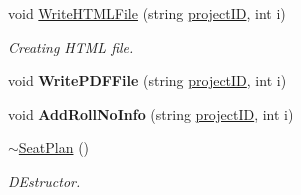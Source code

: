 \begin{DoxyCompactItemize}
\item 
void \hyperlink{classSeatPlan_a67c10e2277f1f2823581cddf4df373c5}{Write\-H\-T\-M\-L\-File} (string \hyperlink{classReadInput_a3ad470a25b3e0a29466bf4ff1f7d8e81}{project\-I\-D}, int i)
\begin{DoxyCompactList}\small\item\em Creating H\-T\-M\-L file. \end{DoxyCompactList}\item 
\hypertarget{classSeatPlan_abce0c5b5545f1bb1ebcf2e578b6ab282}{void {\bfseries Write\-P\-D\-F\-File} (string \hyperlink{classReadInput_a3ad470a25b3e0a29466bf4ff1f7d8e81}{project\-I\-D}, int i)}\label{classSeatPlan_abce0c5b5545f1bb1ebcf2e578b6ab282}

\item 
\hypertarget{classSeatPlan_a3257eb25ac9c82d2757d2a7144614762}{void {\bfseries Add\-Roll\-No\-Info} (string \hyperlink{classReadInput_a3ad470a25b3e0a29466bf4ff1f7d8e81}{project\-I\-D}, int i)}\label{classSeatPlan_a3257eb25ac9c82d2757d2a7144614762}

\item 
\hyperlink{classSeatPlan_a373a1d60b6617a2e424f7d2f8866ec2e}{$\sim$\-Seat\-Plan} ()
\begin{DoxyCompactList}\small\item\em D\-Estructor. \end{DoxyCompactList}\end{DoxyCompactItemize}
